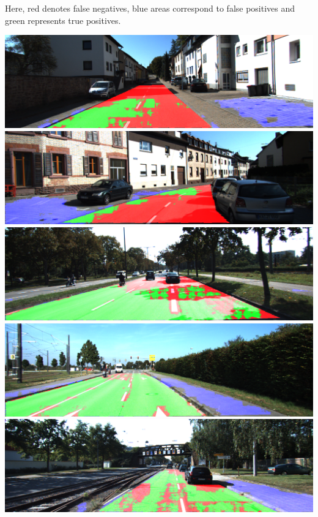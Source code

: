 Here, red denotes false negatives, blue areas correspond to false positives and green represents true positives. 

\includegraphics[scale=0.2]{figures/kitty_eval/Persp_um_road_000077.png}
\includegraphics[scale=0.2]{figures/kitty_eval/Persp_um_road_000095.png}
\includegraphics[scale=0.2]{figures/kitty_eval/Persp_umm_road_000025.png}
\includegraphics[scale=0.2]{figures/kitty_eval/Persp_umm_road_000040.png}
\includegraphics[scale=0.2]{figures/kitty_eval/Persp_umm_road_000066.png}
